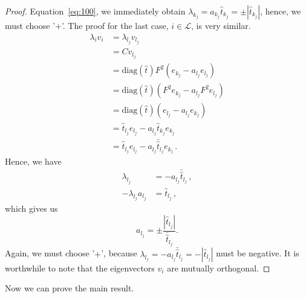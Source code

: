 \begin{proof}[Proof]
  Equation~\eqref{eq:100}, we immediately obtain $\lambda_{k_{j}} =
  a_{k_{j}}\hat{t}_{k_{j}} = \pm|\hat{t}_{k_{j}}|$, hence, we must choose '$+$'. The proof
  for the last case, $i\in\mathcal{L}$, is very similar.
  \begin{equation}
    \label{eq:102}
    \begin{split}
      \lambda_{i}v_{i}
      & = \lambda_{l_{j}}v_{l_{j}} \\
      & = Cv_{l_{j}}\\
      & = \mathrm{diag}(\hat{t})F^{2}(e_{k_{j}} - a_{l_{j}} e_{l_{j}})\\
      & = \mathrm{diag}(\hat{t})(F^{2}e_{k_{j}} - a_{l_{j}}F^{2}e_{l_j})\\
      & =  \mathrm{diag}(\hat{t})(e_{l_{j}} - a_{l_{j}}e_{k_{j}})\\
      & = \hat{t}_{l_{j}} e_{l_{j}} - a_{l_{j}}\hat{t}_{k_{j}}e_{k_{j}} \\
      & = \hat{t}_{l_{j}} e_{l_{j}} - a_{l_{j}}\bar{\hat{t}}_{l_{j}}e_{k_{j}} \,.  
    \end{split}
  \end{equation}
  Hence, we have
  \begin{equation}
    \label{eq:103}
    \begin{split}
      \lambda_{l_{j}} & = -a_{l_{j}}\bar{\hat{t}}_{l_{j}} \,, \\
      -\lambda_{l_{j}} a_{l_{j}} & = \hat{t}_{l_{j}} \,,
    \end{split}
  \end{equation}
  which gives us
  \begin{equation}
    \label{eq:104}
    a_{l_{j}} = \pm\frac{|\hat{t}_{l_{j}}|}{\bar{\hat{t}}_{l_{j}}}.
  \end{equation}
  Again, we must choose '$+$', because $\lambda_{l_{j}} =
  -a_{l_{j}}\bar{\hat{t}}_{l_{j}}=-|\hat t_{l_{j}}|$ must be
  negative. It is worthwhile to note that the eigenvectors $v_{i}$ are
  mutually orthogonal.
\end{proof}

Now we can prove the main result.


